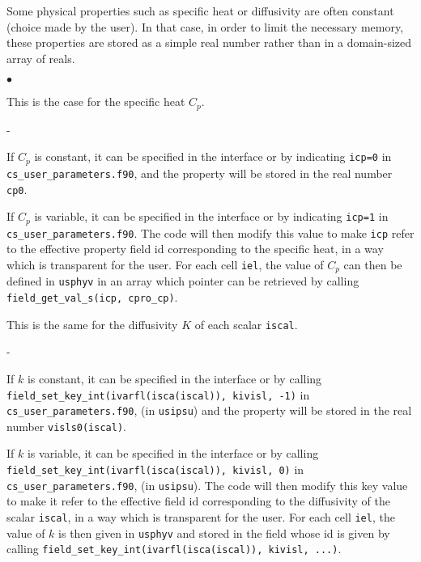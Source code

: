 {{{{\label{provar}
Some physical properties such as specific heat or diffusivity are often
constant (choice made by the user).
In that case, in order to limit the necessary memory, these
properties are stored as a simple real number rather than in a domain-sized
array of reals.
\begin{list}{$\bullet$}{}
\item This is the case for the specific heat $C_p$.
\begin{list}{-}{}
\item If $C_p$ is constant, it can be specified in
      the interface or by indicating \texttt{icp=0} in \\
      \texttt{cs\_user\_parameters.f90}, and the property will be stored in
      the real number \texttt{cp0}.
\item If $C_p$ is variable, it can be specified in the interface or by
      indicating \texttt{icp=1} in \\
      \texttt{cs\_user\_parameters.f90}. The code will then
      modify this value to make \texttt{icp} refer to the effective
      property field id corresponding to the specific heat,
      in a way which is transparent for the user. For each cell
      \texttt{iel}, the value of $C_p$ can then be defined in \texttt{usphyv}
      in an array which pointer can be retrieved by calling
      \texttt{field\_get\_val\_s(icp, cpro\_cp)}.
\end{list}
\item This is the same for the diffusivity $K$ of each scalar \texttt{iscal}.
\begin{list}{-}{}
\item If $k$ is constant, it can be specified in the interface or by
      calling \texttt{field\_set\_key\_int(ivarfl(isca(iscal)), kivisl, -1)}
      in \texttt{cs\_user\_parameters.f90}, (in \texttt{usipsu}) and the property
      will be stored in the real number \texttt{visls0(iscal)}.
\item If $k$ is variable, it can be specified in the interface or by
      calling \texttt{field\_set\_key\_int(ivarfl(isca(iscal)), kivisl, 0)}
      in \texttt{cs\_user\_parameters.f90}, (in \texttt{usipsu}). The code will then
      modify this key value to make it refer to the effective
      field id corresponding to the diffusivity of the scalar
      \texttt{iscal}, in a way which is transparent for the user. For each cell
      \texttt{iel}, the value of $k$ is then given in \texttt{usphyv} and stored
      in the field whose id is given by calling
      \texttt{field\_set\_key\_int(ivarfl(isca(iscal)), kivisl, ...)}.
\end{list}
\end{list}

}}}}

